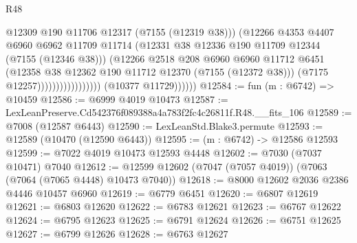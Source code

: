 \begin{lexlean}{R48}
\begin{coremodule}
                                            @12309
                                            @190
                                            @11706
                                            @12317
                                            (@7155 (@12319 @38)))
                                          (@12266
                                            @4353
                                            @4407
                                            @6960
                                            @6962
                                            @11709
                                            @11714
                                            (@12331
                                              @38
                                              @12336
                                              @190
                                              @11709
                                              @12344
                                              (@7155 (@12346 @38)))
                                            (@12266
                                              @2518
                                              @208
                                              @6960
                                              @6960
                                              @11712
                                              @6451
                                              (@12358
                                                @38
                                                @12362
                                                @190
                                                @11712
                                                @12370
                                                (@7155 (@12372 @38)))
                                              (@7175 @12257)))))))))))))))))
              (@10377 @11729))))))
@12584 := fun (m : @6742) => @10459
@12586 := @6999 @4019 @10473
@12587 := LexLeanPreserve.Cd542376f089388a4a783f2fc4c26811f.R48.__fits_106
@12589 := @7008 (@12587 @6443)
@12590 := LexLeanStd.Blake3.permute
@12593 := @12589 (@10470 (@12590 @6443))
@12595 := (m : @6742) -> @12586 @12593
@12599 := @7022 @4019 @10473 @12593 @4448
@12602 := @7030 (@7037 @10471) @7040
@12612 := @12599 @12602 (@7047 (@7057 @4019)) (@7063 (@7064 (@7065 @4448) @10473 @7040))
@12618 := @8000 @12602 @2036 @2386 @4446 @10457 @6960
@12619 := @6779 @6451
@12620 := @6807 @12619
@12621 := @6803 @12620
@12622 := @6783 @12621
@12623 := @6767 @12622
@12624 := @6795 @12623
@12625 := @6791 @12624
@12626 := @6751 @12625
@12627 := @6799 @12626
@12628 := @6763 @12627

\end{coremodule}
\end{lexlean}
